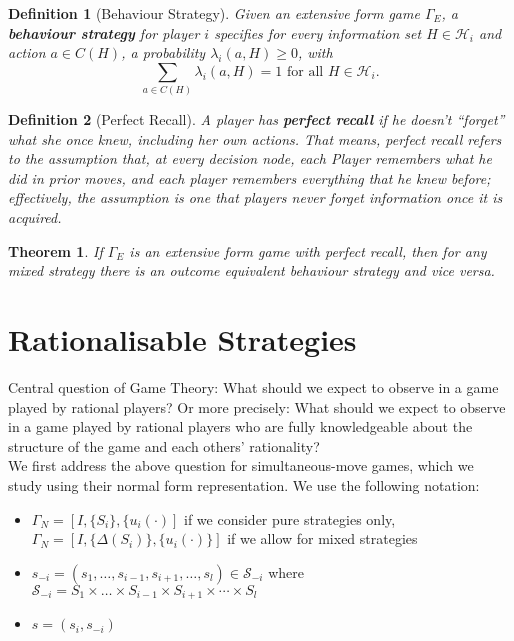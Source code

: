 \documentclass[12pt]{extreport} %
\theoremstyle{named}
\theoremstyle{itshape}
\newtheorem{theorem}[unnamedtheorem]{Theorem}
\newtheorem*{definition}{Definition}
\theoremstyle{normal}
\begin{document}
\begin{definition}[Behaviour Strategy]
	Given an extensive form game $\Gamma_E$, a \textbf{behaviour strategy} for player $i$ specifies for every information set $H \in \mathcal{H}_i$ and action $a \in C(H)$, a probability $\lambda_i(a, H) \geq 0$, with
	$$ \sum_{a \in C(H)} \lambda_i(a, H) = 1 \text{ for all } H \in \mathcal{H}_i. $$
\end{definition}

\begin{definition}[Perfect Recall]
	A player has \textbf{perfect recall} if he doesn't \enquote{forget} what she once knew, including her own actions. That means, perfect recall refers to the assumption that, at every decision node, each Player remembers what he did in prior moves, and each player remembers everything that he knew before; effectively, the assumption is one that players never forget information once it is acquired.
\end{definition}

\begin{theorem}
	If $\Gamma_E$ is an extensive form game with perfect recall, then for any mixed strategy there is an outcome equivalent behaviour strategy and vice versa.	
\end{theorem}

\section{Rationalisable Strategies}

Central question of Game Theory: What should we expect to observe in a game played by rational players? Or more precisely: What should we expect to observe in a game played by rational players who are fully knowledgeable about the structure of the game and each others' rationality? ~\\

We first address the above question for simultaneous-move games, which we study using their normal form representation. We use the following notation:
\begin{itemize}
	\item $\Gamma_N = \left[I, \{ S_i \}, \{ u_i(\cdot) \right]$ if we consider pure strategies only, ~\\
		$\Gamma_{N} = \left[I, \{ \Delta(S_i)\}, \{ u_i(\cdot) \} \right]$ if we allow for mixed strategies
	\item $s_{-i} = (s_1, \dotsc, s_{i-1}, s_{i+1}, \dotsc, s_l) \in \mathcal{S}_{-i}$ where $\mathcal{S}_{-i} = S_1 \times \dotsc \times S_{i-1} \times S_{i+1} \times \cdots \times S_{l}$
	\item $s = (s_i, s_{-i})$
\end{itemize}
\end{document}
